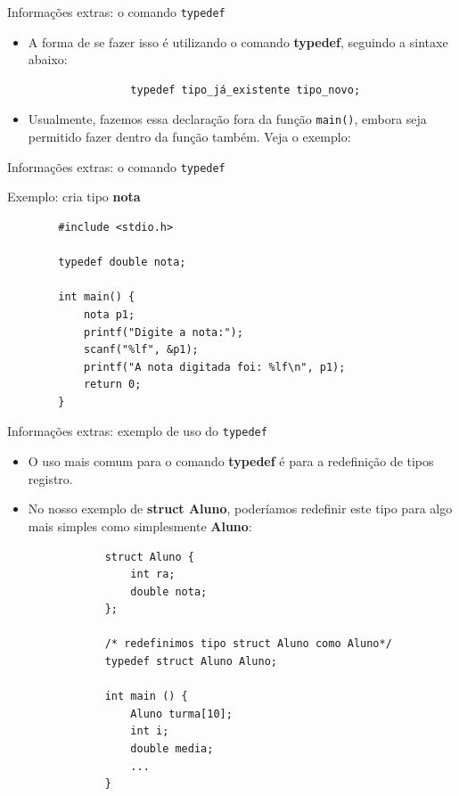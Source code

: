 \documentclass[handout]{beamer}
\begin{document}
\begin{frame}[fragile]{Informações extras: o comando \texttt{typedef}}

    \begin{itemize}
        \item A forma de se fazer isso é utilizando o comando
        \textbf{typedef}, seguindo a sintaxe abaixo:

        \begin{center}
            \begin{verbatim}
                typedef tipo_já_existente tipo_novo;
            \end{verbatim}
        \end{center}

        \item Usualmente, fazemos essa declaração fora da função
        \texttt{main()}, embora seja permitido fazer dentro da função
        também. Veja o exemplo:
    \end{itemize}
\end{frame}

\begin{frame}[fragile]{Informações extras: o comando \texttt{typedef}}

    Exemplo: cria tipo \textbf{nota}
    \begin{verbatim}
        #include <stdio.h>

        typedef double nota;

        int main() {
            nota p1;
            printf("Digite a nota:");
            scanf("%lf", &p1);
            printf("A nota digitada foi: %lf\n", p1);
            return 0;
        }
    \end{verbatim}
\end{frame}

\begin{frame}[fragile]{Informações extras: exemplo de uso do \texttt{typedef}}

    \begin{itemize}
        \item O uso mais comum para o comando \textbf{typedef} é para
        a redefinição de tipos registro.
        \item No nosso exemplo de \textbf{struct Aluno}, poderíamos
        redefinir este tipo para algo mais simples como simplesmente
        \textbf{Aluno}:
        \begin{verbatim}
            struct Aluno {
                int ra;
                double nota;
            };

            /* redefinimos tipo struct Aluno como Aluno*/
            typedef struct Aluno Aluno;

            int main () {
                Aluno turma[10];
                int i;
                double media;
                ...
            }
        \end{verbatim}
    \end{itemize}
\end{frame}
\end{document}
